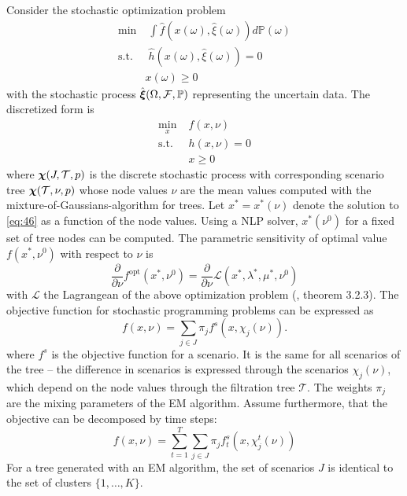 Consider the stochastic optimization problem
\begin{subequations}
  \begin{align}
    \label{eq:49}
    \min&\;\int \hat{f}(x(\omega),\hat{\xi}(\omega))d\mathbb{P}(\omega)\\
    \text{s.t.}&\; \hat{h}(x(\omega),\hat{\xi}(\omega)) = 0\\
    &x(\omega)\geq 0
  \end{align}
\end{subequations}
with the stochastic process $\hat{\boldsymbol\xi}(\Omega, \mathcal{F}, \mathbb{P})$ representing the uncertain data.
The discretized form is\begin{subequations}\label{eq:46} \begin{align}
     \min\limits_{x}&\; f(x,\nu)\\
    \text{s.t.}&\; h(x,\nu) = 0\\
    &\; x \geq 0
  \end{align}
\end{subequations}
where $\boldsymbol\chi(J, \mathcal{T}, p)$ is the discrete stochastic process with corresponding scenario tree $\boldsymbol\chi(\mathcal{T}, \nu, p)$ whose node values $\nu$ are the mean values computed with the mixture-of-Gaussians-algorithm for trees.
Let $x^*=x^*(\nu)$ denote the solution to \eqref{eq:46} as a function of the node values.
Using a NLP solver, $x^*(\nu^0)$ for a fixed set of tree nodes can be computed.
The parametric sensitivity of optimal value $f(x^*,\nu^0)$ with respect to $\nu$ is
\begin{equation}
  \label{eq:47}
  \frac{\partial }{\partial \nu}f^{\mathrm{opt}}(x^*,\nu^0) =  \frac{\partial }{\partial \nu}\mathcal{L}(x^*,\lambda^*, \mu^*,\nu^0)
\end{equation}
with $\mathcal{L}$ the Lagrangean of the above optimization problem (, theorem 3.2.3).
The objective function for stochastic programming problems can be expressed as
\begin{equation}
  \label{eq:45}
  f(x,\nu) = \sum_{j\in J} \pi_jf^s(x,\chi_j(\nu)).
\end{equation}
where $f^s$ is the objective function for a scenario.
It is the same for all scenarios of the tree -- the difference in scenarios is expressed through the scenarios $\chi_j(\nu)$, which depend on the node values through the filtration tree $\mathcal{T}$.
The weights $\pi_j$ are the mixing parameters of the EM algorithm.
Assume furthermore, that the objective can be decomposed by time steps:
\begin{equation}
  \label{eq:48}
  f(x,\nu) = \sum_{t=1}^T\sum_{j\in J}\pi_jf_{t}^s(x,\chi_{j}^t(\nu))
\end{equation}
For a tree generated with an EM algorithm, the set of scenarios $J$ is identical to the set of clusters $\{1,\ldots,K\}$.


